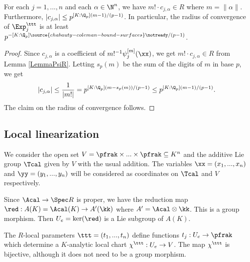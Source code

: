 \begin{lemma} \label{LemmaCvExp} For each $j=1,...,n$ and each $\alpha\in \N^n$, we have $m!\cdot c_{j,\alpha}\in R$ where $m=\|\alpha\|$. Furthermore, $|c_{j,\alpha}|\le p^{[K:\Q_p](m-1)/(p-1)}$. In particular, the radius of convergence of $\Exp^{\ttt}_j$ is at least $p^{-[K:\Q_p]
\source{chabauty-coleman-bound-surfaces}
\notready/(p-1)}$.
\end{lemma}
\begin{proof} Since $c_{j,\alpha}$ is a coefficient of $m!^{-1} \psi_j^{[m]}(\xx)$, we get $m!\cdot c_{j,\alpha}\in R$ from Lemma \ref{LemmaPsiR}. Letting $s_p(m)$ be the sum of the digits of $m$ in base $p$, we get
$$
|c_{j,\alpha}|\le \frac{1}{|m!|} =p^{[K:\Q_p](m-s_p(m))/(p-1)}\le p^{[K:\Q_p](m-1)/(p-1)}.
$$
The claim on the radius of convergence follows.
\end{proof}

\subsection{Local linearization}\label{SecLocLin} We consider the open set $V = \pfrak\times ...\times \pfrak\subseteq K^n$ and the additive Lie group $\Tcal$ given by $V$ with the usual addition. The variables $\xx=(x_1,...,x_n)$ and $\yy=(y_1,...,y_n)$ will be considered as coordinates on $\Tcal$ and $V$ respectively.

Since $\Acal\to \Spec R$ is proper, we have the reduction map $\red : A(K)=\Acal(K)\to A'(\kk)$ where $A'=\Acal\otimes \kk$. This is a group morphism. Then $U_e=\ker(\red)$ is a Lie subgroup of $A(K)$.

The $R$-local parameters $\ttt=(t_1,...,t_n)$ define functions $t_j:U_e\to \pfrak$ which determine a $K$-analytic local chart $\chi^\ttt:U_e\to V$. The map $\chi^\ttt$ is bijective, although it does not need to be a group morphism.

